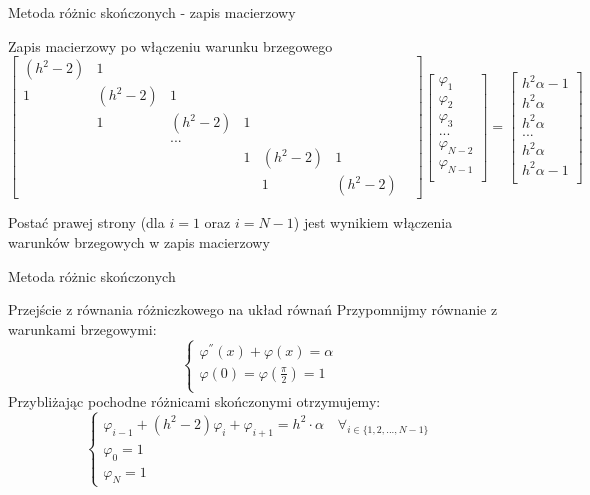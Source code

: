 \begin{frame}{Metoda różnic skończonych - zapis macierzowy}
	\begin{exampleblock}{Zapis macierzowy po włączeniu warunku brzegowego}
	{\scriptsize
	$$
	\begin{bmatrix}
	(h^2 -2) & 1 &  &  &  &  & \\ 
	1&  (h^2 -2)& 1 &  &  &  & \\ 
	& 1 &  (h^2 -2)& 1 &  &  & \\ 
	&  &  ...& &  &  & \\ 
	&  &  &  1 & (h^2 -2) & 1 & \\ 
	&  &  &  & 1 &  (h^2 -2) &
	\end{bmatrix}		
	\begin{bmatrix}
	\varphi_1 \\
	\varphi_2 \\
	\varphi_3 \\
	...\\
	\varphi_{N-2}\\
	\varphi_{N-1}\\
	\end{bmatrix}		
	= 		
	\begin{bmatrix} 
	h^2\alpha -1 \\
	h^2\alpha\\
	h^2\alpha\\
	... \\
	h^2\alpha\\
	h^2\alpha - 1\\
	\end{bmatrix}
	$$}
	
	Postać prawej strony (dla $i = 1$ oraz $i = N-1$) jest wynikiem włączenia warunków brzegowych w zapis macierzowy
	\end{exampleblock}
\end{frame}
\begin{frame}{Metoda różnic skończonych}
	\begin{exampleblock}{Przejście z równania różniczkowego na układ równań}
		Przypomnijmy równanie z warunkami brzegowymi:
		$$
		\begin{cases}
		\varphi^{''}(x) + \varphi(x) = \alpha \\
		\varphi(0) = \varphi(\frac{\pi}{2}) = 1 \\
		\end{cases}
		$$
		Przybliżając pochodne różnicami skończonymi otrzymujemy:
		$$
		\begin{cases}
		\varphi_{i-1} + (h^2 - 2)\varphi_i + \varphi_{i+1} = h^2 \cdot \alpha \quad \forall_{i \in \{1,2, ..., N-1\}} \\
		\varphi_0 = 1 \\
		\varphi_N = 1
		\end{cases}
		$$
	\end{exampleblock}	
\end{frame}






